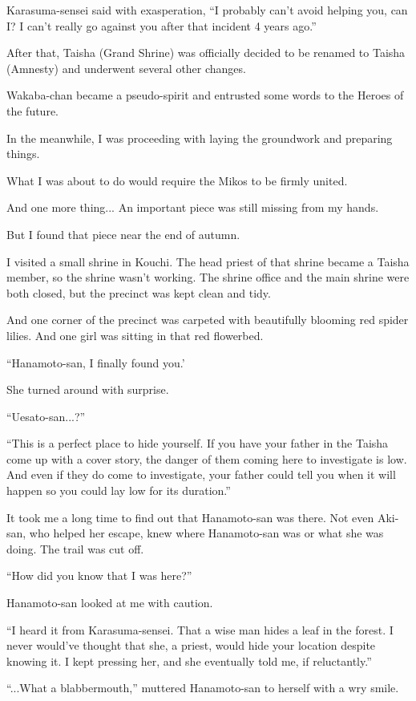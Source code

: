 Karasuma-sensei said with exasperation, ``I probably can't avoid helping you, can I? I can't really go against you after that incident 4 years ago.''


After that, Taisha (Grand Shrine) was officially decided to be renamed to Taisha (Amnesty) and underwent several other changes.

Wakaba-chan became a pseudo-spirit and entrusted some words to the Heroes of the future.

In the meanwhile, I was proceeding with laying the groundwork and preparing things.

What I was about to do would require the Mikos to be firmly united.

And one more thing... An important piece was still missing from my hands.

But I found that piece near the end of autumn.

I visited a small shrine in Kouchi. The head priest of that shrine became a Taisha member, so the shrine wasn't working. The shrine office and the main shrine were both closed, but the precinct was kept clean and tidy.

And one corner of the precinct was carpeted with beautifully blooming red spider lilies. And one girl was sitting in that red flowerbed.

``Hanamoto-san, I finally found you.'

She turned around with surprise.

``Uesato-san...?''

``This is a perfect place to hide yourself. If you have your father in the Taisha come up with a cover story, the danger of them coming here to investigate is low. And even if they do come to investigate, your father could tell you when it will happen so you could lay low for its duration.''

It took me a long time to find out that Hanamoto-san was there. Not even Aki-san, who helped her escape, knew where Hanamoto-san was or what she was doing. The trail was cut off.

``How did you know that I was here?''

Hanamoto-san looked at me with caution.

``I heard it from Karasuma-sensei. That a wise man hides a leaf in the forest. I never would've thought that she, a priest, would hide your location despite knowing it. I kept pressing her, and she eventually told me, if reluctantly.''

``...What a blabbermouth,'' muttered Hanamoto-san to herself with a wry smile.

